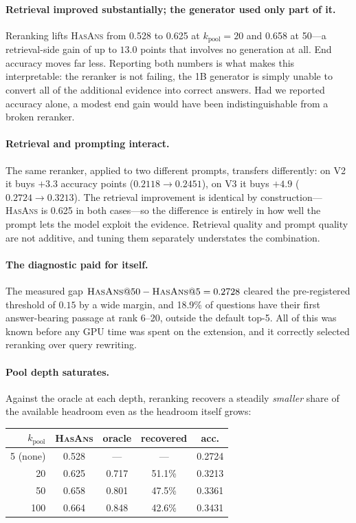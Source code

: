 \documentclass[11pt]{article}
\begin{document}
\paragraph{Retrieval improved substantially; the generator used only part of it.} Reranking
lifts \textsc{HasAns} from 0.528 to 0.625 at $k_{\text{pool}}{=}20$ and 0.658 at 50---a
retrieval-side gain of up to $13.0$ points that involves no generation at all. End accuracy
moves far less. Reporting both numbers is what makes this interpretable: the reranker is not
failing, the 1B generator is simply unable to convert all of the additional evidence into
correct answers. Had we reported accuracy alone, a modest end gain would have been
indistinguishable from a broken reranker.

\paragraph{Retrieval and prompting interact.} The same reranker, applied to two different
prompts, transfers differently: on \textsc{V2} it buys $+3.3$ accuracy points
($0.2118 \rightarrow 0.2451$), on \textsc{V3} it buys $+4.9$ ($0.2724 \rightarrow 0.3213$).
The retrieval improvement is identical by construction---\textsc{HasAns} is 0.625 in both
cases---so the difference is entirely in how well the prompt lets the model exploit the
evidence. Retrieval quality and prompt quality are not additive, and tuning them separately
understates the combination.

\paragraph{The diagnostic paid for itself.} The measured gap
$\textsc{HasAns}@50 - \textsc{HasAns}@5 = 0.2728$ cleared the pre-registered threshold of
$0.15$ by a wide margin, and 18.9\% of questions have their first answer-bearing passage at
rank 6--20, outside the default top-5. All of this was known before any GPU time was spent on
the extension, and it correctly selected reranking over query rewriting.

\paragraph{Pool depth saturates.}
\label{sec:saturation}
Against the oracle at each depth, reranking recovers a steadily \emph{smaller} share of the
available headroom even as the headroom itself grows:

\begin{center}\small
\begin{tabular}{@{}rcccc@{}}
\toprule
$k_{\text{pool}}$ & \textsc{HasAns} & oracle & recovered & acc. \\
\midrule
5 (none) & 0.528 & --- & --- & 0.2724 \\
20  & 0.625 & 0.717 & 51.1\% & 0.3213 \\
50  & 0.658 & 0.801 & 47.5\% & 0.3361 \\
100 & 0.664 & 0.848 & 42.6\% & 0.3431 \\
\bottomrule
\end{tabular}
\end{center}
\end{document}
